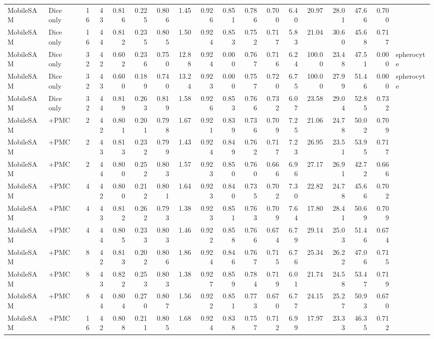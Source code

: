 \documentclass[10pt]{article}
\begin{document}
\begin{landscape}
{\begin{longtable}{l l r r r r r r r r r r r r r r r l}
MobileSAM & Dice only & 16 & 43 & 0.816 & 0.225 & 0.806 & 1.45 & 0.926 & 0.851 & 0.786 & 0.700 & 6.40 & 20.97 & 28.01 & 47.66 & 0.700 &  \\
MobileSAM & Dice only & 16 & 44 & 0.812 & 0.235 & 0.805 & 1.50 & 0.924 & 0.853 & 0.752 & 0.717 & 5.83 & 21.04 & 30.60 & 45.68 & 0.717 &  \\
MobileSAM & Dice only & 32 & 42 & 0.602 & 0.236 & 0.750 & 12.88 & 0.924 & 0.000 & 0.767 & 0.716 & 6.24 & 100.00 & 23.48 & 47.51 & 0.000 & spherocyte \\
MobileSAM & Dice only & 32 & 43 & 0.600 & 0.189 & 0.740 & 13.24 & 0.923 & 0.000 & 0.757 & 0.720 & 6.75 & 100.00 & 27.99 & 51.46 & 0.000 & spherocyte \\
MobileSAM & Dice only & 32 & 44 & 0.819 & 0.263 & 0.819 & 1.58 & 0.926 & 0.853 & 0.766 & 0.732 & 6.07 & 23.58 & 29.04 & 52.85 & 0.732 &  \\
MobileSAM & +PMC & 2 & 42 & 0.801 & 0.201 & 0.798 & 1.67 & 0.921 & 0.839 & 0.736 & 0.709 & 7.25 & 21.06 & 24.78 & 50.02 & 0.709 &  \\
MobileSAM & +PMC & 2 & 43 & 0.813 & 0.232 & 0.799 & 1.43 & 0.924 & 0.849 & 0.762 & 0.717 & 7.23 & 26.95 & 23.51 & 53.95 & 0.717 &  \\
MobileSAM & +PMC & 2 & 44 & 0.800 & 0.252 & 0.803 & 1.57 & 0.923 & 0.850 & 0.760 & 0.666 & 6.96 & 27.17 & 26.91 & 42.72 & 0.666 &  \\
MobileSAM & +PMC & 4 & 42 & 0.800 & 0.212 & 0.801 & 1.64 & 0.923 & 0.840 & 0.735 & 0.702 & 7.30 & 22.82 & 24.78 & 45.66 & 0.702 &  \\
MobileSAM & +PMC & 4 & 43 & 0.812 & 0.262 & 0.793 & 1.38 & 0.923 & 0.851 & 0.763 & 0.709 & 7.64 & 17.80 & 28.41 & 50.69 & 0.709 &  \\
MobileSAM & +PMC & 4 & 44 & 0.805 & 0.233 & 0.803 & 1.46 & 0.922 & 0.858 & 0.766 & 0.674 & 6.79 & 29.14 & 25.03 & 51.46 & 0.674 &  \\
MobileSAM & +PMC & 8 & 42 & 0.813 & 0.202 & 0.806 & 1.86 & 0.924 & 0.846 & 0.767 & 0.715 & 6.76 & 25.34 & 26.22 & 47.06 & 0.715 &  \\
MobileSAM & +PMC & 8 & 43 & 0.822 & 0.253 & 0.803 & 1.38 & 0.927 & 0.859 & 0.784 & 0.719 & 6.01 & 21.74 & 24.58 & 53.47 & 0.719 &  \\
MobileSAM & +PMC & 8 & 44 & 0.804 & 0.270 & 0.807 & 1.56 & 0.922 & 0.851 & 0.773 & 0.670 & 6.77 & 24.15 & 25.27 & 50.93 & 0.670 &  \\
MobileSAM & +PMC & 16 & 42 & 0.808 & 0.211 & 0.805 & 1.68 & 0.924 & 0.838 & 0.757 & 0.712 & 6.99 & 17.97 & 23.33 & 46.35 & 0.712 &  \\

\end{longtable}}
\end{landscape}
\end{document}
